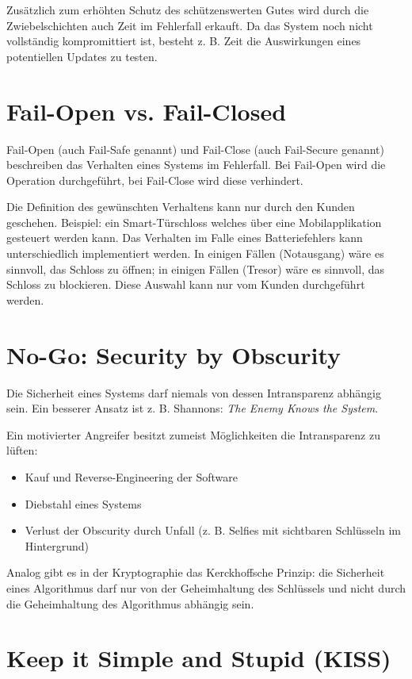Zusätzlich zum erhöhten Schutz des schützenswerten Gutes wird durch die Zwiebelschichten auch Zeit im Fehlerfall erkauft. Da das System noch nicht vollständig kompromittiert ist, besteht z. B. Zeit die Auswirkungen eines potentiellen Updates zu testen.

\section{Fail-Open vs. Fail-Closed}

Fail-Open (auch Fail-Safe genannt) und Fail-Close (auch Fail-Secure genannt) beschreiben das Verhalten eines Systems im Fehlerfall. Bei Fail-Open wird die Operation durchgeführt, bei Fail-Close wird diese verhindert.

Die Definition des gewünschten Verhaltens kann nur durch den Kunden geschehen. Beispiel: ein Smart-Türschloss welches über eine Mobilapplikation gesteuert werden kann. Das Verhalten im Falle eines Batteriefehlers kann unterschiedlich implementiert werden. In einigen Fällen (Notausgang) wäre es sinnvoll, das Schloss zu öffnen; in einigen Fällen (Tresor) wäre es sinnvoll, das Schloss zu blockieren. Diese Auswahl kann nur vom Kunden durchgeführt werden.

\section{No-Go: Security by Obscurity}

Die Sicherheit eines Systems darf niemals von dessen Intransparenz abhängig sein. Ein besserer Ansatz ist z. B. Shannons: \textit{The Enemy Knows the System}.

Ein motivierter Angreifer besitzt zumeist Möglichkeiten die Intransparenz zu lüften:
\begin{itemize}
	\item Kauf und Reverse-Engineering der Software
	\item Diebstahl eines Systems
	\item Verlust der Obscurity durch Unfall (z. B. Selfies mit sichtbaren Schlüsseln im Hintergrund)
\end{itemize}

Analog gibt es in der Kryptographie das Kerckhoffsche Prinzip: die Sicherheit eines Algorithmus darf nur von der Geheimhaltung des Schlüssels und nicht durch die Geheimhaltung des Algorithmus abhängig sein.

\section{Keep it Simple and Stupid (KISS)}

